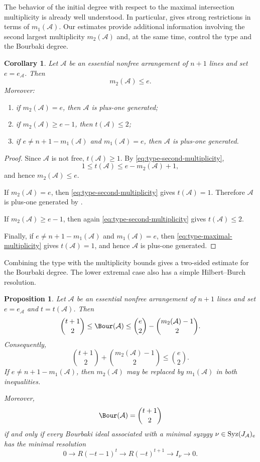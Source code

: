 \documentclass[11pt]{amsart}   %
\newtheorem{Corollary}[Theorem]{Corollary}
\newtheorem{Proposition}[Theorem]{Proposition}
\theoremstyle{definition}
\def\syz{\mbox{\rm Syz}}
\def\A{{\mathcal A}}
\begin{document}
The behavior of the initial degree with respect to the maximal intersection multiplicity is already well understood. In particular, \cite[Theorem~1.10]{Dimca-local-derivations} gives strong restrictions in terms of $m_1(\A)$. Our estimates provide additional information involving the second largest multiplicity $m_2(\A)$ and, at the same time, control the type and the Bourbaki degree.

\begin{Corollary}
\label{cor:multiplicity-and-type-consequences}
Let $\A$ be an essential nonfree arrangement of $n+1$ lines and set $e=e_\A$. Then
\[
m_2(\A)\leq e.
\]
Moreover:
\begin{enumerate}
\item if $m_2(\A)=e$, then $\A$ is plus-one generated;
\item if $m_2(\A)\geq e-1$, then $t(\A)\leq2$;
\item if $e\neq n+1-m_1(\A)$ and $m_1(\A)=e$, then $\A$ is
plus-one generated.
\end{enumerate}
\end{Corollary}

\begin{proof}
Since $\A$ is not free, $t(\A)\geq1$. By \eqref{eq:type-second-multiplicity},
\[
1\leq t(\A)\leq e-m_2(\A)+1,
\]
and hence $m_2(\A)\leq e$.

If $m_2(\A)=e$, then \eqref{eq:type-second-multiplicity} gives $t(\A)=1$. Therefore $\A$ is plus-one generated by \cite[Theorem~1.1 and Definition~1.2]{Abe-Dimca-Pokora-hierarchy}.

If $m_2(\A)\geq e-1$, then again \eqref{eq:type-second-multiplicity} gives $t(\A)\leq2$.

Finally, if $e\neq n+1-m_1(\A)$ and $m_1(\A)=e$, then \eqref{eq:type-maximal-multiplicity} gives $t(\A)=1$, and hence $\A$ is plus-one generated.
\end{proof}

Combining the type with the multiplicity bounds gives a two-sided estimate for the Bourbaki degree. The lower extremal case also has a simple Hilbert--Burch resolution.

\begin{Proposition}
\label{prop:type-bourbaki-multiplicity-sandwich}
Let $\A$ be an essential nonfree arrangement of $n+1$ lines and set $e=e_\A$ and $t=t(\A)$. Then
\[
\binom{t+1}{2}
\leq
\Bour(\A)
\leq
\binom e2-\binom{m_2(\A)-1}{2}.
\]
Consequently,
\[
\binom{t+1}{2}+\binom{m_2(\A)-1}{2}
\leq\binom e2.
\]
If $e\neq n+1-m_1(\A)$, then $m_2(\A)$ may be replaced by $m_1(\A)$ in both inequalities.

Moreover,
\[
\Bour(\A)=\binom{t+1}{2}
\]
if and only if every Bourbaki ideal associated with a minimal syzygy $\nu\in\syz(J_\A)_e$ has the minimal resolution
\[
0\longrightarrow R(-t-1)^t
\longrightarrow R(-t)^{t+1} \longrightarrow I_\nu\longrightarrow0.
\]
\end{Proposition}
\end{document}
